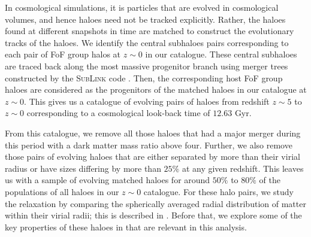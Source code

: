 In cosmological simulations, it is particles that are evolved in cosmological volumes, and hence haloes need not be tracked explicitly. Rather, the haloes found at different snapshots in time are matched to construct the evolutionary tracks of the haloes. We identify the central subhaloes pairs corresponding to each pair of FoF group halos at $z\sim 0$ in our catalogue. These central subhaloes are traced back along the most massive progenitor branch using merger trees constructed by the \textsc{SubLink} code \citep{2015RodriguezGeneletalSubLink}. Then, the corresponding host FoF group haloes are considered as the progenitors of the matched haloes in our catalogue at $z \sim 0$. This gives us a catalogue of evolving pairs of haloes from redshift $z \sim 5$ to $z \sim 0$ corresponding to a cosmological look-back time of $12.63$ Gyr.

From this catalogue, we remove all those haloes that had a major merger during this period with a dark matter mass ratio above four. Further, we also remove those pairs of evolving haloes that are either separated by more than their virial radius or have sizes differing by more than $25\% $ at any given redshift. This leaves us with a sample of evolving matched haloes for around $50\%$ to $80\%$ of the populations of all haloes in our $z \sim 0$ catalogue. For these halo pairs, we study the relaxation by comparing the spherically averaged radial distribution of matter within their virial radii; this is described in  . Before that, we explore some of the key properties of these haloes in  that are relevant in this analysis.

